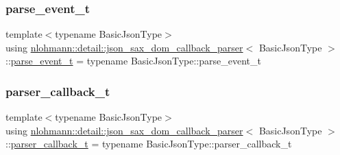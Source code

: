 \mbox{\label{classnlohmann_1_1detail_1_1json__sax__dom__callback__parser_aac6d706967b2ecc2510e172577d8550b}} 
\subsubsection{\texorpdfstring{parse\+\_\+event\+\_\+t}{parse\_event\_t}}
{\footnotesize\ttfamily template$<$typename Basic\+Json\+Type$>$ \\
using \hyperlink{classnlohmann_1_1detail_1_1json__sax__dom__callback__parser}{nlohmann\+::detail\+::json\+\_\+sax\+\_\+dom\+\_\+callback\+\_\+parser}$<$ Basic\+Json\+Type $>$\+::\hyperlink{classnlohmann_1_1detail_1_1json__sax__dom__callback__parser_aac6d706967b2ecc2510e172577d8550b}{parse\+\_\+event\+\_\+t} =  typename Basic\+Json\+Type\+::parse\+\_\+event\+\_\+t}

\mbox{\label{classnlohmann_1_1detail_1_1json__sax__dom__callback__parser_a4f636086fa8e7cf26c35c8afd50903ce}} 
\subsubsection{\texorpdfstring{parser\+\_\+callback\+\_\+t}{parser\_callback\_t}}
{\footnotesize\ttfamily template$<$typename Basic\+Json\+Type$>$ \\
using \hyperlink{classnlohmann_1_1detail_1_1json__sax__dom__callback__parser}{nlohmann\+::detail\+::json\+\_\+sax\+\_\+dom\+\_\+callback\+\_\+parser}$<$ Basic\+Json\+Type $>$\+::\hyperlink{classnlohmann_1_1detail_1_1json__sax__dom__callback__parser_a4f636086fa8e7cf26c35c8afd50903ce}{parser\+\_\+callback\+\_\+t} =  typename Basic\+Json\+Type\+::parser\+\_\+callback\+\_\+t}

